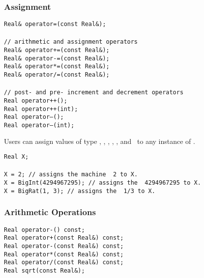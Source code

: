 \subsubsection{Assignment}
\begin{progb} {
\> \tt Real\& operator=(const Real\&);\\
\\
\>  // arithmetic and assignment operators\\
\> \tt	Real\& operator+=(const Real\&); \\
\> \tt	Real\& operator-=(const Real\&); \\
\> \tt	Real\& operator*=(const Real\&); \\
\> \tt	Real\& operator/=(const Real\&); \\
\\
\>  // post- and pre- increment and decrement operators\\
\> \tt	Real operator++(); \\
\> \tt	Real operator++(int); \\
\> \tt	Real operator--(); \\
\> \tt	Real operator--(int);
}\end{progb}

Users can assign values of type \int, \lng, \double, \Int, \Rat, and
\BF\ to any instance of \real.

\nopagebreak
\begin{progb}{
\> \tt Real X; \\
\\
\> \tt X = 2; // assigns the machine \int\ 2 to {\tt X}.
\\
\> \tt X = BigInt(4294967295); // assigns the \Int\ 4294967295 to {\tt X}.
\\
\> \tt X = BigRat(1, 3); // assigns the \Rat\ 1/3 to {\tt X}.
}\end{progb}

\bigskip
\subsubsection{Arithmetic Operations}
\begin{progb} {
\> \tt   Real operator-() const; \\
\> \tt 	 Real operator+(const Real\&) const; \\
\> \tt 	 Real operator-(const Real\&) const; \\
\> \tt 	 Real operator*(const Real\&) const; \\
\> \tt 	 Real operator/(const Real\&) const; \\
\> \tt 	 Real sqrt(const Real\&);
}\end{progb}

